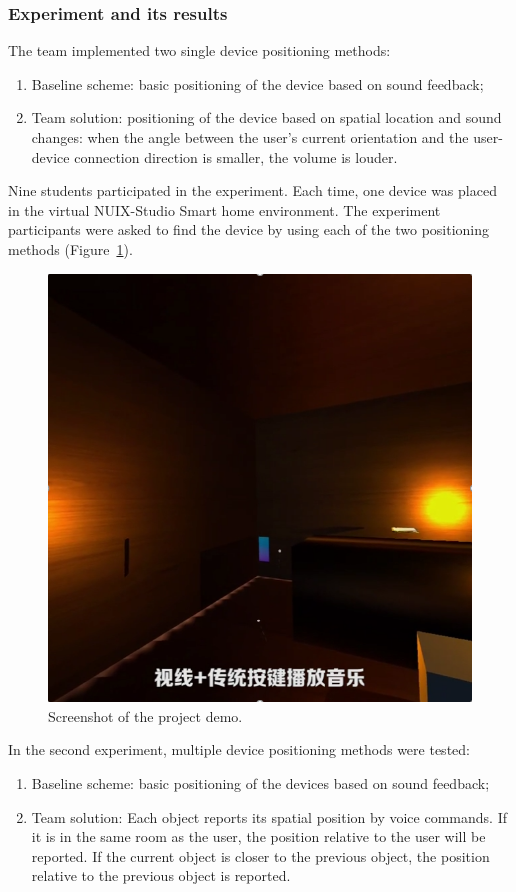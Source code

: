 \subsubsection{Experiment and its results}
The team implemented two single device positioning methods:
\begin{enumerate}
    \item Baseline scheme: basic positioning of the device based on sound feedback;
    \item Team solution: positioning of the device based on spatial location and sound changes: when the angle between the user's current orientation and the user-device connection direction is smaller, the volume is louder.
\end{enumerate}

Nine students participated in the experiment. Each time, one device was placed in the virtual NUIX-Studio Smart home environment. The experiment participants were asked to find the device by using each of the two positioning methods (Figure~\ref{fig:Project1-1-figure}).

\begin{figure}
  \centering
  \includegraphics[width=0.6\linewidth]{figures/Project_1-1.png}
  \caption{Screenshot of the project demo.}
  \label{fig:Project1-1-figure}
\end{figure}

In the second experiment, multiple device positioning methods were tested:
\begin{enumerate}
    \item Baseline scheme: basic positioning of the devices based on sound feedback;
    \item Team solution: Each object reports its spatial position by voice commands. If it is in the same room as the user, the position relative to the user will be reported. If the current object is closer to the previous object, the position relative to the previous object is reported. \end{enumerate}

